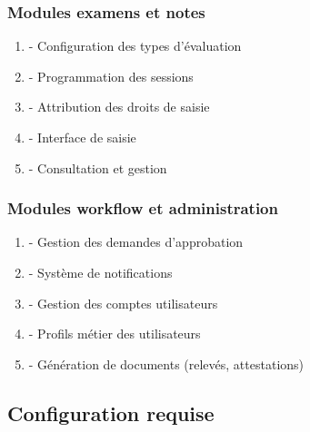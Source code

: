 \subsubsection{Modules examens et notes}

\begin{enumerate}[leftmargin=*]
    \item {} - Configuration des types d'évaluation
    \item {} - Programmation des sessions
    \item {} - Attribution des droits de saisie
    \item {} - Interface de saisie
    \item {} - Consultation et gestion
\end{enumerate}

\subsubsection{Modules workflow et administration}

\begin{enumerate}[leftmargin=*]
    \item {} - Gestion des demandes d'approbation
    \item {} - Système de notifications
    \item {} - Gestion des comptes utilisateurs
    \item {} - Profils métier des utilisateurs
    \item {} - Génération de documents (relevés, attestations)
\end{enumerate}

\subsection{Configuration requise}

